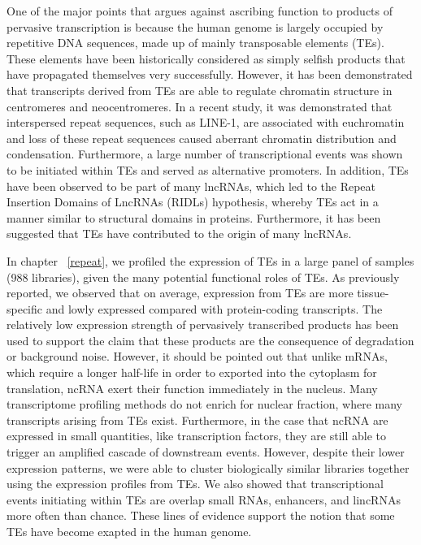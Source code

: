 One of the major points that argues against ascribing function to products of pervasive transcription is because the human genome is largely occupied by repetitive DNA sequences, made up of mainly transposable elements (TEs). These elements have been historically considered as simply selfish products that have propagated themselves very successfully\cite{doolittle1980selfish,orgel1980selfish}. However, it has been demonstrated that transcripts derived from TEs are able to regulate chromatin structure in centromeres and neocentromeres\cite{pmid19180186}. In a recent study, it was demonstrated that interspersed repeat sequences, such as LINE-1, are associated with euchromatin and loss of these repeat sequences caused aberrant chromatin distribution and condensation\cite{pmid24581492}. Furthermore, a large number of transcriptional events was shown to be initiated within TEs and served as alternative promoters\cite{pmid19377475}. In addition, TEs have been observed to be part of many lncRNAs\cite{pmid23181609}, which led to the Repeat Insertion Domains of LncRNAs (RIDLs) hypothesis\cite{pmid24850885}, whereby TEs act in a manner similar to structural domains in proteins. Furthermore, it has been suggested that TEs have contributed to the origin of many lncRNAs\cite{pmid23637635,pmid25218058}.

In chapter ~\ref{repeat}, we profiled the expression of TEs in a large panel of samples (988 libraries), given the many potential functional roles of TEs. As previously reported, we observed that on average, expression from TEs are more tissue-specific and lowly expressed compared with protein-coding transcripts. The relatively low expression strength of pervasively transcribed products has been used to support the claim that these products are the consequence of degradation or background noise. However, it should be pointed out that unlike mRNAs, which require a longer half-life in order to exported into the cytoplasm for translation, ncRNA exert their function immediately in the nucleus. Many transcriptome profiling methods do not enrich for nuclear fraction, where many transcripts arising from TEs exist\cite{pmid24777452}. Furthermore, in the case that ncRNA are expressed in small quantities, like transcription factors, they are still able to trigger an amplified cascade of downstream events. However, despite their lower expression patterns, we were able to cluster biologically similar libraries together using the expression profiles from TEs. We also showed that transcriptional events initiating within TEs are overlap small RNAs, enhancers, and lincRNAs more often than chance. These lines of evidence support the notion that some TEs have become exapted in the human genome.
